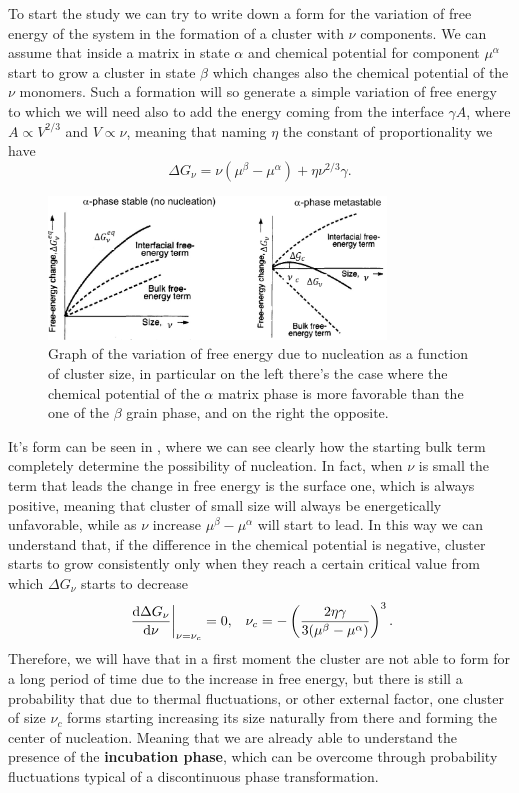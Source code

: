 To start the study we can try to write down a form for the variation of free energy of the system in the formation of a cluster with $\nu$ components. We can assume that inside a matrix in state $\alpha$ and chemical potential for component $\mu^\alpha$ start to grow a cluster in state $\beta$ which changes also the chemical potential of the $\nu$ monomers. Such a formation will so generate a simple variation of free energy to which we will need also to add the energy coming from the interface $\gamma A$, where $A \propto V^{2/3}$ and $V \propto \nu$, meaning that naming $\eta$ the constant of proportionality we have
\begin{equation}
    \Delta G_\nu = \nu\left( \mu^\beta - \mu^\alpha \right) + \eta\nu^{2/3}\gamma.
\end{equation}
\begin{figure}[t]
    \centering
    \includegraphics[width=0.8\textwidth]{Immagini/FreeEnNucle.png}
    \caption
    {
        Graph of the variation of free energy due to nucleation as a function of cluster size, in particular on the left there's the case where the chemical potential of the $\alpha$ matrix phase is more favorable than the one of the $\beta$ grain phase, and on the right the opposite.
    }
    \label{fig:FreeEnNucle}
\end{figure} 
It's form can be seen in , where we can see clearly how the starting bulk term completely determine the possibility of nucleation. In fact, when $\nu$ is small the term that leads the change in free energy is the surface one, which is always positive, meaning that cluster of small size will always be energetically unfavorable, while as $\nu$ increase $\mu^\beta - \mu^\alpha$ will start to lead. In this way we can understand that, if the difference in the chemical potential is negative, cluster starts to grow consistently only when they reach a certain critical value from which $\Delta G_\nu$ starts to decrease
\begin{align}
    &\eval{\dv{\Delta G_\nu}{\nu}}_{\nu = \nu_c} = 0, &\nu_c = -\left( \frac{2\eta\gamma}{3(\mu^\beta - \mu^\alpha)} \right)^3.
\end{align}
Therefore, we will have that in a first moment the cluster are not able to form for a long period of time due to the increase in free energy, but there is still a probability that due to thermal fluctuations, or other external factor, one cluster of size $\nu_c$ forms starting increasing its size naturally from there and forming the center of nucleation. Meaning that we are already able to understand the presence of the \textbf{incubation phase}, which can be overcome through probability fluctuations typical of a discontinuous phase transformation.

